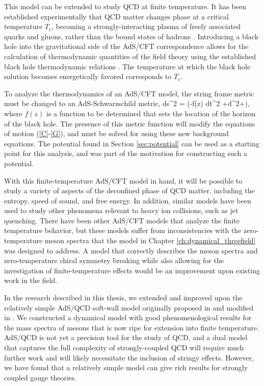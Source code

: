 This model can be extended to study QCD at finite temperature. 
It has been established experimentally that QCD matter changes phase at a critical temperature $T_c$, becoming a strongly-interacting plasma of freely associated quarks and gluons, rather than the bound states of hadrons \cite{qgp,qgp3,phases}.
Introducing a black hole into the gravitational side of the AdS/CFT correspondence allows for the calculation of thermodynamic quantities of the field theory using the established black hole thermodynamic relations \cite{Kovtun2005,Son:2007vk,Herzog:2006ra,BallonBayona:2007vp}.
The temperature at which the black hole solution becomes energetically favored corresponds to $T_c$.

To analyze the thermodynamics of an AdS/CFT model, the string frame metric must be changed to an AdS-Schwarzschild metric,
\be
ds^2 = \left(-f(z) dt^2 +d^2+\right), 
\ee
where $f(z)$ is a function to be determined that sets the location of the horizon of the black hole.
The presence of this metric function will modify the equations of motion (\ref{C}-\ref{G}), and must be solved for using these new background equations.
The potential found in Section \ref{sec:potential} can be used as a starting point for this analysis, and was part of the motivation for constructing such a potential.

With this finite-temperature AdS/CFT model in hand, it will be possible to study a variety of aspects of the deconfined phase of QCD matter, including the entropy, speed of sound, and free energy.
In addition, similar models have been used to study other phenomena relevant to heavy ion collisions, such as jet quenching.
There have been other AdS/CFT models that analyze the finite temperature behavior, but these models suffer from inconsistencies with the zero-temperature meson spectra that the model in Chapter \ref{ch:dynamical_threefield} was designed to address.
A model that correctly describes the meson spectra and zero-temperature chiral symmetry breaking while also allowing for the investigation of finite-temperature effects would be an improvement upon existing work in the field.

In the research described in this thesis, we extended and improved upon the relatively simple AdS/QCD soft-wall model originally proposed in \cite{karch-katz-son-adsqcd} and modified in \cite{gherghetta-kelley}.
We constructed a dynamical model with good phenomenological results for the mass spectra of mesons that is now ripe for extension into finite temperature.
 AdS/QCD is not yet a precision tool for the study of QCD, and a dual model that captures the full complexity of strongly-coupled QCD will require much further work and will likely necessitate the inclusion of stringy effects.
However, we have found that a relatively simple model can give rich results for strongly coupled gauge theories. 




